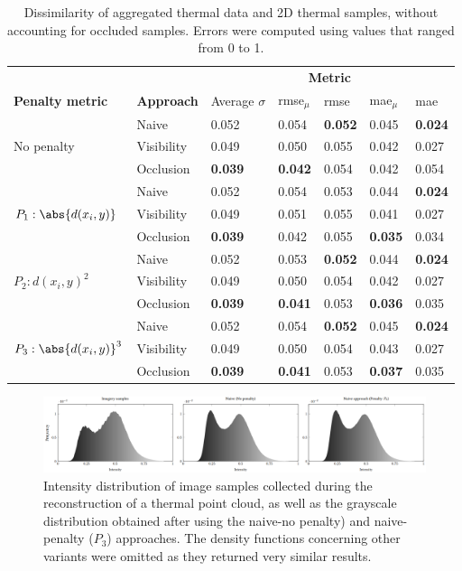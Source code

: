 \renewcommand{\arraystretch}{1.2}
\begin{table}[ht]
    \sffamily\small
    \caption{Dissimilarity of aggregated thermal data and 2D thermal samples, without accounting for occluded samples. Errors were computed using values that ranged from 0 to 1. }
    \label{table:thermal_error_dispersion}
    \begin{tabular}{@{}lllllll@{}}
    \toprule
    & & \multicolumn{5}{c}{\textbf{Metric}} \\
    \cmidrule{3-7}
    \textbf{Penalty metric} & \textbf{Approach} & Average $\sigma$ & \acrshort{rmse}$_{\mu}$ & \acrshort{rmse} & \acrshort{mae}$_{\mu}$ & \acrshort{mae}\\
    \midrule
    \multirow{3}{*}{No penalty} & Naive & 0.052 & 0.054 & \textbf{0.052} & 0.045 & \textbf{0.024}\\
    & Visibility & 0.049 & 0.050 & 0.055 & 0.042 & 0.027\\
    & Occlusion & \textbf{0.039} & \textbf{0.042} & 0.054 & 0.042 & 0.054\\
    \midrule
    \multirow{3}{*}{$P_1 : \abs{d(x_i, y)}$} & Naive & 0.052 & 0.054 & 0.053 & 0.044 & \textbf{0.024} \\
    & Visibility & 0.049 & 0.051 & 0.055 & 0.041 & 0.027 \\
    & Occlusion & \textbf{0.039} & 0.042 & 0.055 & \textbf{0.035} & 0.034\\
    \midrule
    \multirow{3}{*}{$P_2 : d(x_i, y)^2$} & Naive & 0.052 & 0.053 & \textbf{0.052} & 0.044 & \textbf{0.024} \\
    & Visibility & 0.049 & 0.050 & 0.054 & 0.042 & 0.027 \\
    & Occlusion & \textbf{0.039} & \textbf{0.041} & 0.053 & \textbf{0.036} & 0.035\\
    \midrule
    \multirow{3}{*}{$P_3 : \abs{d(x_i, y)}^3$} & Naive & 0.052 & 0.054 & \textbf{0.052} & 0.045 & \textbf{0.024} \\
    & Visibility & 0.049 & 0.050 & 0.054 & 0.043 & 0.027 \\
    & Occlusion & \textbf{0.039} & \textbf{0.041} & 0.053 & \textbf{0.037} & 0.035 \\
    \bottomrule
    \end{tabular}
    \normalsize
\end{table}
\renewcommand{\arraystretch}{1}

\begin{figure}
    \centering
    \includegraphics[width=\linewidth]{figs/thermal_projection/density_function.png}
	\caption{Intensity distribution of image samples collected during the reconstruction of a thermal point cloud, as well as the grayscale distribution obtained after using the naive-no penalty) and naive-penalty ($P_3$) approaches. The density functions concerning other variants were omitted as they returned very similar results.}
	\label{fig:thermal_histogram_results}
\end{figure}

